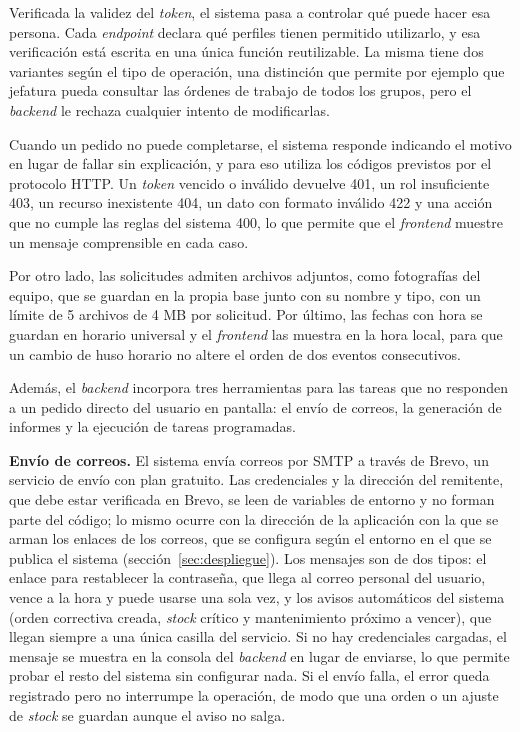 \documentclass[10pt]{article}
\begin{document}
Verificada la validez del \textit{token}, el sistema pasa a controlar qué puede hacer esa persona. Cada \textit{endpoint} declara qué perfiles tienen permitido utilizarlo, y esa verificación está escrita en una única función reutilizable. La misma tiene dos variantes según el tipo de operación, una distinción que permite por ejemplo que jefatura pueda consultar las órdenes de trabajo de todos los grupos, pero el \textit{backend} le rechaza cualquier intento de modificarlas. 

Cuando un pedido no puede completarse, el sistema responde indicando el motivo en lugar de fallar sin explicación, y para eso utiliza los códigos previstos por el protocolo HTTP. Un \textit{token} vencido o inválido devuelve 401, un rol insuficiente 403, un recurso inexistente 404, un dato con formato inválido 422 y una acción que no cumple las reglas del sistema 400, lo que permite que el \textit{frontend} muestre un mensaje comprensible en cada caso.

Por otro lado, las solicitudes admiten archivos adjuntos, como fotografías del equipo, que se guardan en la propia base junto con su nombre y tipo, con un límite de 5 archivos de 4 MB por solicitud. Por último, las fechas con hora se guardan en horario universal y el \textit{frontend} las muestra en la hora local, para que un cambio de huso horario no altere el orden de dos eventos consecutivos. 

Además, el \textit{backend} incorpora tres herramientas para las tareas que no responden a un pedido directo del usuario en pantalla: el envío de correos, la generación de informes y la ejecución de tareas programadas.

\textbf{Envío de correos.} El sistema envía correos por SMTP a través de Brevo, un servicio de envío con plan gratuito. Las credenciales y la dirección del remitente, que debe estar verificada en Brevo, se leen de variables de entorno y no forman parte del código; lo mismo ocurre con la dirección de la aplicación con la que se arman los enlaces de los correos, que se configura según el entorno en el que se publica el sistema (sección~\ref{sec:despliegue}). Los mensajes son de dos tipos: el enlace para restablecer la contraseña, que llega al correo personal del usuario, vence a la hora y puede usarse una sola vez, y los avisos automáticos del sistema (orden correctiva creada, \textit{stock} crítico y mantenimiento próximo a vencer), que llegan siempre a una única casilla del servicio. Si no hay credenciales cargadas, el mensaje se muestra en la consola del \textit{backend} en lugar de enviarse, lo que permite probar el resto del sistema sin configurar nada. Si el envío falla, el error queda registrado pero no interrumpe la operación, de modo que una orden o un ajuste de \textit{stock} se guardan aunque el aviso no salga. 
\end{document}
